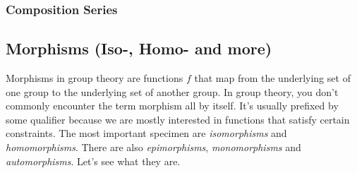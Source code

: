 

\subsubsection{Composition Series}








\subsection{Morphisms (Iso-, Homo- and more)}


Morphisms in group theory are functions $f$ that map from the underlying set of one group to the underlying set of another group. In group theory, you don't commonly encounter the term morphism all by itself. It's usually prefixed by some qualifier because we are mostly interested in functions that satisfy certain constraints. The most important specimen are \emph{isomorphisms} and \emph{homomorphisms}. There are also \emph{epimorphisms}, \emph{monomorphisms} and \emph{automorphisms}. Let's see what they are.

